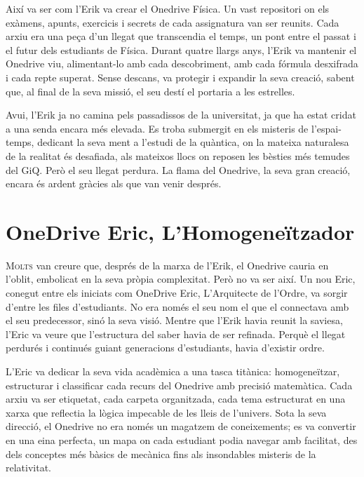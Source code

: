 Així va ser com l'Erik va crear el Onedrive Física. Un vast repositori on els exàmens, apunts, exercicis i secrets de cada assignatura van ser reunits. Cada arxiu era una peça d'un llegat que transcendia el temps, un pont entre el passat i el futur dels estudiants de Física. Durant quatre llargs anys, l'Erik va mantenir el Onedrive viu, alimentant-lo amb cada descobriment, amb cada fórmula desxifrada i cada repte superat. Sense descans, va protegir i expandir la seva creació, sabent que, al final de la seva missió, el seu destí el portaria a les estrelles.

Avui, l'Erik ja no camina pels passadissos de la universitat, ja que ha estat cridat a una senda encara més elevada. Es troba submergit en els misteris de l'espai-temps, dedicant la seva ment a l'estudi de la quàntica, on la mateixa naturalesa de la realitat és desafiada, als mateixos llocs on reposen les bèsties més temudes del GiQ. Però el seu llegat perdura. La flama del Onedrive, la seva gran creació, encara és ardent gràcies als que van venir després.

\chapter{OneDrive Eric, L'Homogeneïtzador}


\lettrine[loversize=0.2, lines=2]{M}{olts} van creure que, després de la marxa de l'Erik, el Onedrive cauria en l'oblit, embolicat en la seva pròpia complexitat. Però no va ser així. Un nou Eric, conegut entre els iniciats com OneDrive Eric, L'Arquitecte de l'Ordre, va sorgir d'entre les files d'estu\-diants. No era només el seu nom el que el connectava amb el seu predecessor, sinó la seva visió. Mentre que l'Erik havia reunit la saviesa, l'Eric va veure que l'estructura del saber havia de ser refinada. Perquè el llegat perdurés i continués guiant generacions d'estudiants, havia d'existir ordre.

L'Eric va dedicar la seva vida acadèmica a una tasca titànica: homogeneïtzar, estructurar i classificar cada recurs del Onedrive amb precisió matemàtica. Cada arxiu va ser etiquetat, cada carpeta organitzada, cada tema estructurat en una xarxa que reflectia la lògica impecable de les lleis de l'univers. Sota la seva direcció, el Onedrive no era només un magatzem de coneixements; es va convertir en una eina perfecta, un mapa on cada estudiant podia navegar amb facilitat, des dels conceptes més bàsics de mecànica fins als insondables misteris de la relativitat.

